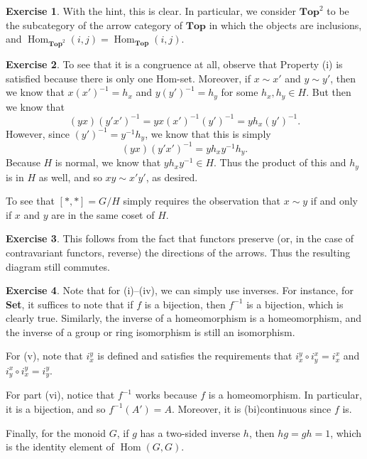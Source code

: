 \documentclass[10pt]{article}
\theoremstyle{definition}
\newtheorem{intex}{Exercise}[section]
\newenvironment{exercise}{\begin{intex}\label{\theintex}}{\end{intex}}
\DeclareMathOperator\Hom{Hom}
\newcommand*\Cat[1]{\textbf{#1}}
\newcommand*\Top{\Cat{Top}}
\newcommand*\Set{\Cat{Set}}
\begin{document}
\begin{exercise} \leavevmode
With the hint, this is clear. In particular, we consider $\Top^2$ to be the subcategory of the arrow category of $\Top$ in which the objects are inclusions, and $\Hom_{\Top^2}(i,j)=\Hom_\Top(i,j)$. 
\end{exercise} 

\begin{exercise} \leavevmode
To see that it is a congruence at all, observe that Property (i) is satisfied because there is only one Hom-set. Moreover, if $x\sim x'$ and $y\sim y'$, then we know that $x(x')^{-1}=h_x$ and $y(y')^{-1}=h_y$ for some $h_x,h_y\in H$. But then we know that \[(yx)(y'x')^{-1}=yx(x')^{-1}(y')^{-1}=yh_x(y')^{-1}.\] However, since $(y')^{-1}=y^{-1}h_y$, we know that this is simply \[(yx)(y'x')^{-1}=yh_xy^{-1}h_y.\] Because $H$ is normal, we know that $yh_xy^{-1}\in H$. Thus the product of this and $h_y$ is in $H$ as well, and so $xy\sim x'y'$, as desired. 

To see that $[*,*]=G/H$ simply requires the observation that $x\sim y$ if and only if $x$ and $y$ are in the same coset of $H$. 
\end{exercise} 

\begin{exercise} \leavevmode
This follows from the fact that functors preserve (or, in the case of contravariant functors, reverse) the directions of the arrows. Thus the resulting diagram still commutes. 
\end{exercise} 

\begin{exercise} \leavevmode
Note that for (i)--(iv), we can simply use inverses. For instance, for \Set, it suffices to note that if $f$ is a bijection, then $f^{-1}$ is a bijection, which is clearly true. Similarly, the inverse of a homeomorphism is a homeomorphism, and the inverse of a group or ring isomorphism is still an isomorphism. 

For (v), note that $i_x^y$ is defined and satisfies the requirements that $i_x^y\circ i_y^x=i_x^x$ and $i_y^x\circ i_x^y=i_y^y$. 

For part (vi), notice that $f^{-1}$ works because $f$ is a homeomorphism. In particular, it is a bijection, and so $f^{-1}(A')=A$. Moreover, it is (bi)continuous since $f$ is. 

Finally, for the monoid $G$, if $g$ has a two-sided inverse $h$, then $hg=gh=1$, which is the identity element of $\Hom(G,G)$. 
\end{exercise} 
\end{document}
